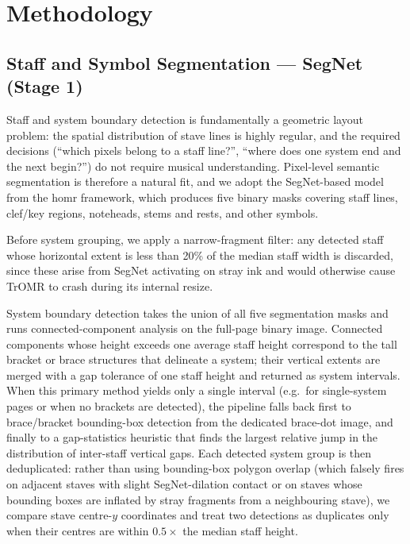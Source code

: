 \documentclass[11pt,a4paper]{article}
\begin{document}
\section{Methodology}

\subsection{Staff and Symbol Segmentation --- SegNet (Stage 1)}

Staff and system boundary detection is fundamentally a geometric layout problem: the spatial distribution of stave lines is highly regular, and the required decisions (``which pixels belong to a staff line?'', ``where does one system end and the next begin?'') do not require musical understanding.
Pixel-level semantic segmentation is therefore a natural fit, and we adopt the SegNet-based model from the homr framework, which produces five binary masks covering staff lines, clef/key regions, noteheads, stems and rests, and other symbols.

Before system grouping, we apply a narrow-fragment filter: any detected staff whose horizontal extent is less than 20\% of the median staff width is discarded, since these arise from SegNet activating on stray ink and would otherwise cause TrOMR to crash during its internal resize.

System boundary detection takes the union of all five segmentation masks and runs connected-component analysis on the full-page binary image.
Connected components whose height exceeds one average staff height correspond to the tall bracket or brace structures that delineate a system; their vertical extents are merged with a gap tolerance of one staff height and returned as system intervals.
When this primary method yields only a single interval (e.g.\ for single-system pages or when no brackets are detected), the pipeline falls back first to brace/bracket bounding-box detection from the dedicated brace-dot image, and finally to a gap-statistics heuristic that finds the largest relative jump in the distribution of inter-staff vertical gaps.
Each detected system group is then deduplicated: rather than using bounding-box polygon overlap (which falsely fires on adjacent staves with slight SegNet-dilation contact or on staves whose bounding boxes are inflated by stray fragments from a neighbouring stave), we compare stave centre-$y$ coordinates and treat two detections as duplicates only when their centres are within $0.5\times$ the median staff height.
\end{document}
